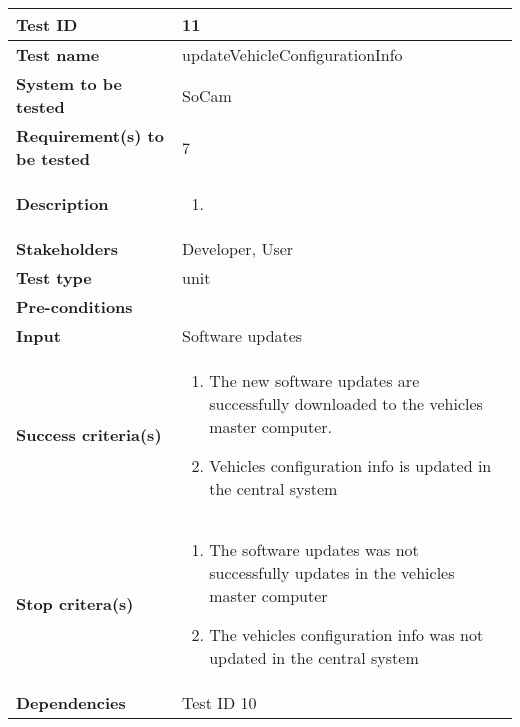 		\begin{table}[H]
			\begin{tabular}{| p{4cm} | p{10cm} |}
			\hline
			\rowcolor{gray}
				{\bf Test ID} & 11 \\ \hline
				{\bf Test name} & updateVehicleConfigurationInfo \\ \hline
				{\bf System to be tested} & SoCam \\ \hline
				{\bf Requirement(s) to be tested} & 7 \\ \hline
				{\bf Description} & 
					\begin{enumerate}
						\item
					\end{enumerate}
				\\ \hline
				{\bf Stakeholders} & Developer, User \\ \hline
				{\bf Test type} & unit \\ \hline
				{\bf Pre-conditions} & \\ \hline
				{\bf Input} & Software updates \\ \hline
				{\bf Success criteria(s)} & 
					\begin{enumerate}
						\item The new software updates are successfully downloaded to
						the vehicles master computer.
						\item Vehicles configuration info is updated in the central system
					\end{enumerate}
				\\ \hline
				{\bf Stop critera(s)} &  
					\begin{enumerate}
						\item The software updates was not successfully updates in the vehicles
						master computer
						\item The vehicles configuration info was not updated in the central system
					\end{enumerate} \\ \hline
				{\bf Dependencies} & Test ID 10 \\ \hline
			\end{tabular}
		\end{table}